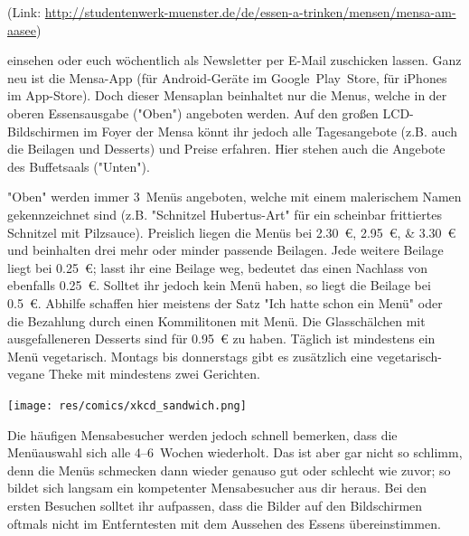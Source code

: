 \begin{multicols*}{2}
\begin{flushleft}
(Link: \url{http://studentenwerk-muenster.de/de/essen-a-trinken/mensen/mensa-am-aasee})
\end{flushleft}

\hangindent=3cm
einsehen oder euch wöchentlich als Newsletter per E-Mail zuschicken lassen. Ganz neu ist die Mensa-App (für Android-Geräte im Google~Play~Store, für iPhones im App-Store). Doch dieser Mensaplan beinhaltet nur die Menus, welche in der oberen Essensausgabe ("Oben") angeboten werden. Auf den großen LCD-Bildschirmen im Foyer der Mensa könnt ihr jedoch alle Tagesangebote (z.B. auch die Beilagen und Desserts) und Preise erfahren. Hier stehen auch die Angebote des Buffetsaals ("Unten").

\hangindent=3cm
"Oben" werden immer 3~Menüs angeboten, welche mit einem malerischem Namen gekennzeichnet sind (z.B. "Schnitzel Hubertus-Art" für ein scheinbar frittiertes Schnitzel mit Pilzsauce). Preislich liegen die Menüs bei \SIlist{2,30; 2,95; 3,30}{\euro} und beinhalten drei mehr oder minder passende Beilagen. Jede weitere Beilage liegt bei \SI{0,25}{\euro}; lasst ihr eine Beilage weg, bedeutet das einen Nachlass von ebenfalls \SI{0,25}{\euro}. Solltet ihr jedoch kein Menü haben, so liegt die Beilage bei \SI{0,5}{\euro}. Abhilfe schaffen hier meistens der Satz "Ich hatte schon ein Menü" oder die Bezahlung durch einen Kommilitonen mit Menü. Die Glasschälchen mit ausgefalleneren Desserts sind für \SI{0,95}{\euro} zu haben. Täglich ist mindestens ein Menü vegetarisch. Montags bis donnerstags gibt es zusätzlich eine vegetarisch-vegane Theke mit mindestens zwei Gerichten.

\begin{center}
\texttt{[image: res/comics/xkcd\_sandwich.png]}
\end{center}

Die häufigen Mensabesucher werden jedoch schnell bemerken, dass die Menüauswahl sich alle 4--6~Wochen wiederholt. Das ist aber gar nicht so schlimm, denn die Menüs schmecken dann wieder genauso gut oder schlecht wie zuvor; so bildet sich langsam ein kompetenter Mensabesucher aus dir heraus. Bei den ersten Besuchen solltet ihr aufpassen, dass die Bilder auf den Bildschirmen oftmals nicht im Entferntesten mit dem Aussehen des Essens übereinstimmen.


\end{multicols*}
